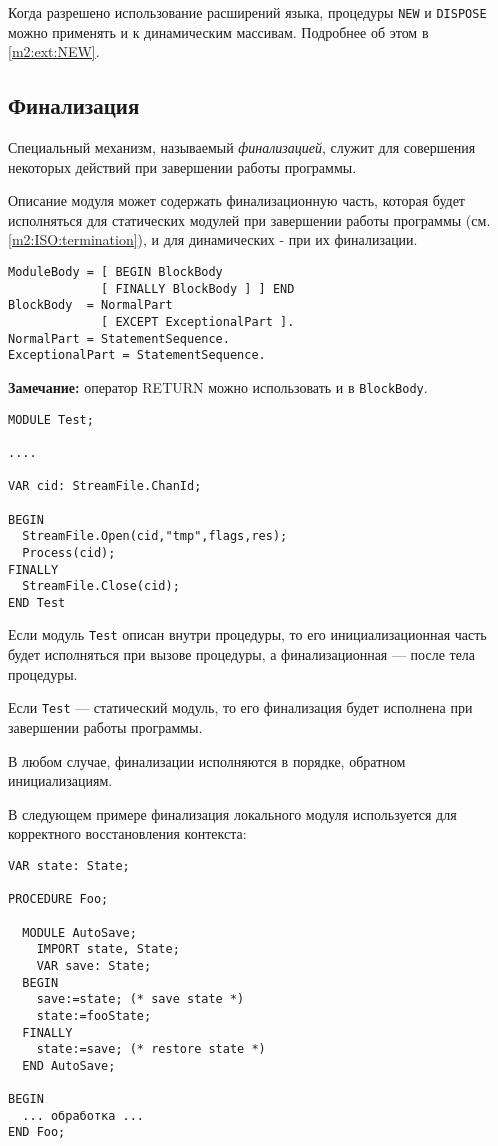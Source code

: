 Когда разрешено использование расширений языка, процедуры
{\tt NEW} и {\tt DISPOSE} можно применять и к динамическим массивам. 
Подробнее об этом в \ref{m2:ext:NEW}.

\subsection{Финализация}\label{m2:ISO:final}

Специальный механизм, называемый {\em финализацией},
служит для совершения некоторых действий при завершении работы программы.

Описание модуля может содержать финализационную часть, которая 
будет исполняться для статических модулей при завершении работы программы
(см. \ref{m2:ISO:termination}), и для динамических - при их
финализации.

\begin{verbatim}
ModuleBody = [ BEGIN BlockBody
             [ FINALLY BlockBody ] ] END
BlockBody  = NormalPart
             [ EXCEPT ExceptionalPart ].
NormalPart = StatementSequence.
ExceptionalPart = StatementSequence.
\end{verbatim}
{\bf Замечание:} оператор RETURN можно использовать и в {\tt BlockBody}.

\Example
\begin{verbatim}
MODULE Test;

....

VAR cid: StreamFile.ChanId;

BEGIN
  StreamFile.Open(cid,"tmp",flags,res);
  Process(cid);
FINALLY
  StreamFile.Close(cid);
END Test
\end{verbatim}

Если модуль {\tt Test} описан внутри процедуры, то
его инициализационная часть будет исполняться при вызове процедуры,
а финализационная --- после тела процедуры.

Если {\tt Test} --- статический модуль, то его финализация будет
исполнена при завершении работы программы.

В любом случае, финализации исполняются в порядке, обратном
инициализациям.

В следующем примере финализация локального модуля используется
для корректного восстановления контекста:
\begin{verbatim}
VAR state: State;

PROCEDURE Foo;

  MODULE AutoSave;
    IMPORT state, State;
    VAR save: State;
  BEGIN
    save:=state; (* save state *)
    state:=fooState;
  FINALLY
    state:=save; (* restore state *)
  END AutoSave;

BEGIN
  ... обработка ...
END Foo;
\end{verbatim}

